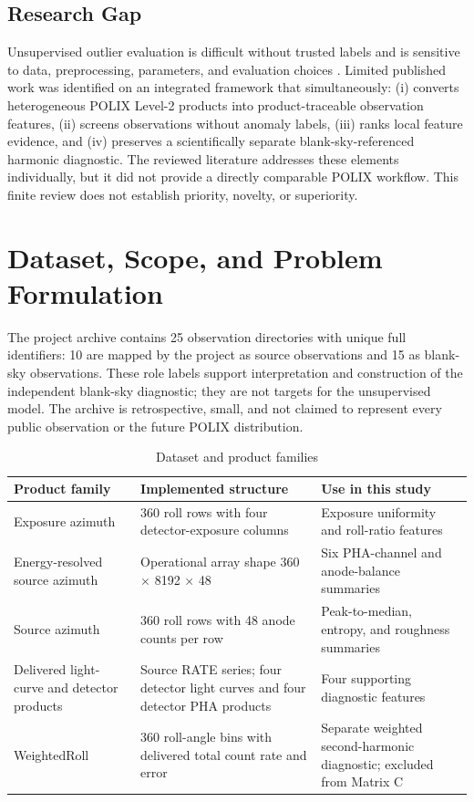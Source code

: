\documentclass[conference]{IEEEtran}
\begin{document}
\subsection{Research Gap}

Unsupervised outlier evaluation is difficult without trusted labels and is sensitive to data, preprocessing, parameters, and evaluation choices \cite{campos2016evaluation}. Limited published work was identified on an integrated framework that simultaneously: (i) converts heterogeneous POLIX Level-2 products into product-traceable observation features, (ii) screens observations without anomaly labels, (iii) ranks local feature evidence, and (iv) preserves a scientifically separate blank-sky-referenced harmonic diagnostic. The reviewed literature addresses these elements individually, but it did not provide a directly comparable POLIX workflow. This finite review does not establish priority, novelty, or superiority.


\section{Dataset, Scope, and Problem Formulation}

The project archive contains 25 observation directories with unique full identifiers: 10 are mapped by the project as source observations and 15 as blank-sky observations. These role labels support interpretation and construction of the independent blank-sky diagnostic; they are not targets for the unsupervised model. The archive is retrospective, small, and not claimed to represent every public observation or the future POLIX distribution.


\begin{table}[t]
\centering
\caption{Dataset and product families}
\label{tab:1}
\footnotesize
\begin{tabular}{@{}p{}p{}p{}@{}}
\toprule
Product family & Implemented structure & Use in this study \\
\midrule
Exposure azimuth & 360 roll rows with four detector-exposure columns & Exposure uniformity and roll-ratio features \\
Energy-resolved source azimuth & Operational array shape 360 $\times$ 8192 $\times$ 48 & Six PHA-channel and anode-balance summaries \\
Source azimuth & 360 roll rows with 48 anode counts per row & Peak-to-median, entropy, and roughness summaries \\
Delivered light-curve and detector products & Source RATE series; four detector light curves and four detector PHA products & Four supporting diagnostic features \\
WeightedRoll & 360 roll-angle bins with delivered total count rate and error & Separate weighted second-harmonic diagnostic; excluded from Matrix C \\
\bottomrule
\end{tabular}
\end{table}
\end{document}
